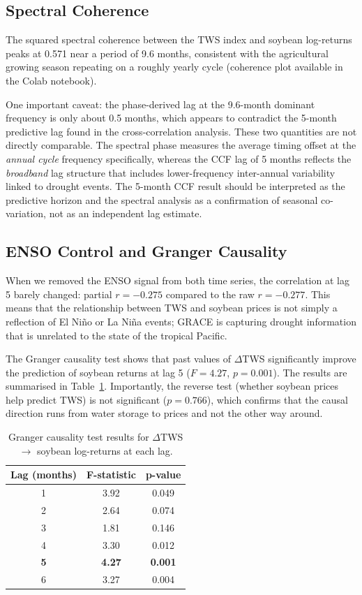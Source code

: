 \documentclass[6pt, twocolumn]{article}
\begin{document}
\subsection{Spectral Coherence}

The squared spectral coherence between the TWS index and soybean
log-returns peaks at 0.571 near a period of 9.6 months, consistent
with the agricultural growing season repeating on a roughly yearly
cycle (coherence plot available in the Colab notebook).

One important caveat: the phase-derived lag at the 9.6-month dominant
frequency is only about 0.5 months, which appears to contradict the
5-month predictive lag found in the cross-correlation analysis. These
two quantities are not directly comparable. The spectral phase measures
the average timing offset at the \emph{annual cycle} frequency
specifically, whereas the CCF lag of 5 months reflects the
\emph{broadband} lag structure that includes lower-frequency
inter-annual variability linked to drought events. The 5-month CCF
result should be interpreted as the predictive horizon and the
spectral analysis as a confirmation of seasonal co-variation, not as
an independent lag estimate.

\subsection{ENSO Control and Granger Causality}

When we removed the ENSO signal from both time series, the
correlation at lag 5 barely changed: partial $r = -0.275$ compared
to the raw $r = -0.277$. This means that the relationship between
TWS and soybean prices is not simply a reflection of El Niño or
La Niña events; GRACE is capturing drought information that is
unrelated to the state of the tropical Pacific.

The Granger causality test shows that past values of $\Delta$TWS
significantly improve the prediction of soybean returns at lag 5
($F = 4.27$, $p = 0.001$). The results are summarised in
Table~\ref{tab:granger}. Importantly, the reverse test (whether
soybean prices help predict TWS) is not significant ($p = 0.766$),
which confirms that the causal direction runs from water storage
to prices and not the other way around.

\begin{table}[htbp]
  \centering
  \small
  \caption{Granger causality test results for
    $\Delta$TWS $\to$ soybean log-returns at each lag.}
  \label{tab:granger}
  \begin{tabular}{@{}ccc@{}}
    \toprule
    Lag (months) & F-statistic & p-value \\
    \midrule
    1 & 3.92 & 0.049 \\
    2 & 2.64 & 0.074 \\
    3 & 1.81 & 0.146 \\
    4 & 3.30 & 0.012 \\
    \textbf{5} & \textbf{4.27} & \textbf{0.001} \\
    6 & 3.27 & 0.004 \\
    \bottomrule
  \end{tabular}
\end{table}
\end{document}
